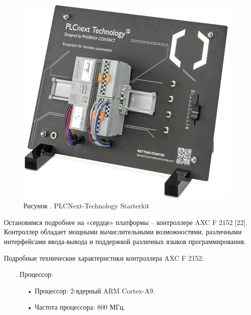 {	\begin{figure}[H]
		\centering
		\def\svgwidth{\textwidth}
		\includegraphics[width=160mm]{images/pclnext_x.png}
		\caption*{\gostFont Рисунок \thechaptercntr .\theimagecntr \spc {--} PLCNext-Technology Starterkit}
	\end{figure}  \addtocounter{imagecntr}{1}
	
	
	\par \redline Остановимся подробнее на «сердце» платформы – контроллере AXC F 2152 [22]. Контроллер обладает мощными вычислительными возможностями, различными интерфейсами ввода-вывода и поддержкой различных языков программирования.
	
	\par \redline Подробные технические характеристики контроллера AXC F 2152:
	
	\begin{itemize}[leftmargin=2.15cm, labelwidth=0.65cm, labelsep=0.0cm] 
		
		\item[\theitemcntr. ] Процессор:
		
		\begin{itemize}[leftmargin=1.5cm, labelwidth=0.65cm, labelsep=0.0cm] 
			
			\item[•] Процессор: 2-ядерный ARM Cortex-A9.
			
			\item[•] Частота процессора: 800 МГц.
			

\end{itemize}
\end{itemize}}
